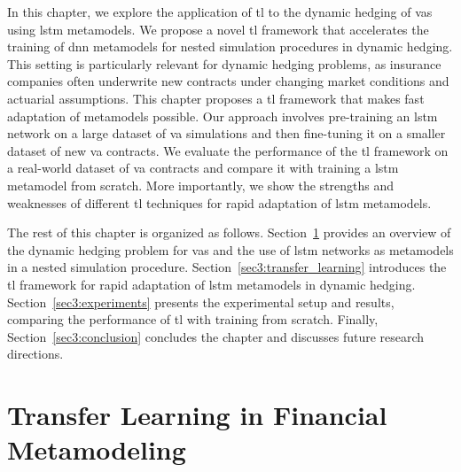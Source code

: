 In this chapter, we explore the application of \gls{tl} to the dynamic hedging of \gls{va}s using \gls{lstm} metamodels.
We propose a novel \gls{tl} framework that accelerates the training of \gls{dnn} metamodels for nested simulation procedures in dynamic hedging.
This setting is particularly relevant for dynamic hedging problems, as insurance companies often underwrite new contracts under changing market conditions and actuarial assumptions.
This chapter proposes a \gls{tl} framework that makes fast adaptation of metamodels possible.
Our approach involves pre-training an \gls{lstm} network on a large dataset of \gls{va} simulations and then fine-tuning it on a smaller dataset of new \gls{va} contracts.
We evaluate the performance of the \gls{tl} framework on a real-world dataset of \gls{va} contracts and compare it with training a \gls{lstm} metamodel from scratch.
More importantly, we show the strengths and weaknesses of different \gls{tl} techniques for rapid adaptation of \gls{lstm} metamodels.

The rest of this chapter is organized as follows.
Section~\ref{sec3:background} provides an overview of the dynamic hedging problem for \gls{va}s and the use of \gls{lstm} networks as metamodels in a nested simulation procedure.
Section~\ref{sec3:transfer_learning} introduces the \gls{tl} framework for rapid adaptation of \gls{lstm} metamodels in dynamic hedging.
Section~\ref{sec3:experiments} presents the experimental setup and results, comparing the performance of \gls{tl} with training from scratch.
Finally, Section~\ref{sec3:conclusion} concludes the chapter and discusses future research directions.

\section{Transfer Learning in Financial Metamodeling} \label{sec3:background}


